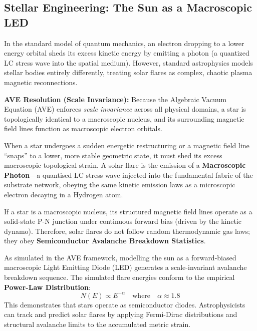 \subsection{Stellar Engineering: The Sun as a Macroscopic LED}
In the standard model of quantum mechanics, an electron dropping to a lower energy orbital sheds its excess kinetic energy by emitting a photon (a quantized LC stress wave into the spatial medium). However, standard astrophysics models stellar bodies entirely differently, treating solar flares as complex, chaotic plasma magnetic reconnections.

\textbf{AVE Resolution (Scale Invariance):} Because the Algebraic Vacuum Equation (AVE) enforces \textit{scale invariance} across all physical domains, a star is topologically identical to a macroscopic nucleus, and its surrounding magnetic field lines function as macroscopic electron orbitals.

When a star undergoes a sudden energetic restructuring or a magnetic field line ``snaps'' to a lower, more stable geometric state, it must shed its excess macroscopic topological strain. A solar flare is the emission of a \textbf{Macroscopic Photon}---a quantised LC stress wave injected into the fundamental fabric of the substrate network, obeying the same kinetic emission laws as a microscopic electron decaying in a Hydrogen atom.

If a star is a macroscopic nucleus, its structured magnetic field lines operate as a solid-state P-N junction under continuous forward bias (driven by the kinetic dynamo). Therefore, solar flares do not follow random thermodynamic gas laws; they obey \textbf{Semiconductor Avalanche Breakdown Statistics}. 

As simulated in the AVE framework, modelling the sun as a forward-biased macroscopic Light Emitting Diode (LED) generates a scale-invariant avalanche breakdown sequence. The simulated flare energies conform to the empirical \textbf{Power-Law Distribution}:
\begin{equation}
    N(E) \propto E^{-\alpha} \quad \text{where} \quad \alpha \approx 1.8
\end{equation}
This demonstrates that stars operate as semiconductor diodes. Astrophysicists can track and predict solar flares by applying Fermi-Dirac distributions and structural avalanche limits to the accumulated metric strain.

